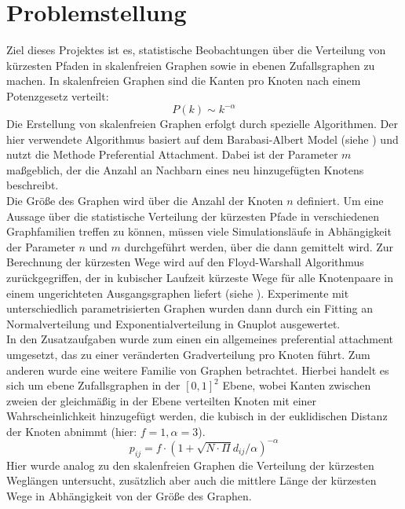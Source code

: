 \documentclass[10pt]{article}
\begin{document}
\lstset{
	language=C,
	basicstyle=\footnotesize,
	frame=tb,
	xleftmargin=.2\textwidth,
	xrightmargin=.2\textwidth
}
\onehalfspacing

\tableofcontents
\newpage
\section{Problemstellung}
 
Ziel dieses Projektes ist es, statistische Beobachtungen über die Verteilung von kürzesten Pfaden in skalenfreien Graphen sowie in ebenen Zufallsgraphen zu machen. In skalenfreien Graphen sind die Kanten pro Knoten nach einem Potenzgesetz verteilt: 
\begin{equation*}
P(k) \sim k^{-\alpha}
\end{equation*}
Die Erstellung von skalenfreien Graphen erfolgt durch spezielle Algorithmen. Der hier verwendete Algorithmus basiert auf dem Barabasi-Albert Model (siehe \cite{Barabasi}) und nutzt die Methode Preferential Attachment. Dabei ist der Parameter $m$ maßgeblich, der die Anzahl an Nachbarn eines neu hinzugefügten Knotens beschreibt. \\

Die Größe des Graphen wird über die Anzahl der Knoten $n$ definiert. Um eine Aussage über die statistische Verteilung der kürzesten Pfade in verschiedenen Graphfamilien treffen zu können, müssen viele Simulationsläufe in Abhängigkeit der Parameter $n$ und $m$ durchgeführt werden, über die dann gemittelt wird.
Zur Berechnung der kürzesten Wege wird auf den Floyd-Warshall Algorithmus zurückgegriffen, der in kubischer Laufzeit kürzeste Wege für alle Knotenpaare in einem ungerichteten Ausgangsgraphen liefert (siehe \cite{Floyd}).
Experimente mit unterschiedlich parametrisierten Graphen wurden dann durch ein Fitting an Normalverteilung und Exponentialverteilung in Gnuplot ausgewertet.\\

In den Zusatzaufgaben wurde zum einen ein allgemeines preferential attachment umgesetzt, das zu einer veränderten Gradverteilung pro Knoten führt. Zum anderen wurde eine weitere Familie von Graphen betrachtet. Hierbei handelt es sich um ebene Zufallsgraphen in der $[0,1]^2$ Ebene, wobei Kanten zwischen zweien der gleichmäßig in der Ebene verteilten Knoten mit einer Wahrscheinlichkeit hinzugefügt werden, die kubisch in der euklidischen Distanz der Knoten abnimmt (hier: $f=1, \alpha=3$). 
\begin{equation*}
p_{ij} = f \cdot (1+\sqrt{N \cdot \Pi}d_{ij}/\alpha)^{-\alpha}
\end{equation*}
Hier wurde analog zu den skalenfreien Graphen die Verteilung der kürzesten Weglängen untersucht, zusätzlich aber auch die mittlere Länge der kürzesten Wege in Abhängigkeit von der Größe des Graphen.
\end{document}
